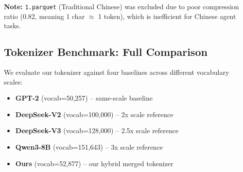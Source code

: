 \textbf{Note:} \texttt{1.parquet} (Traditional Chinese) was excluded due to poor compression ratio (0.82, meaning 1 char $\approx$ 1 token), which is inefficient for Chinese agent tasks.

\subsection{Tokenizer Benchmark: Full Comparison}

We evaluate our tokenizer against four baselines across different vocabulary scales:
\begin{itemize}
    \item \textbf{GPT-2} (vocab=50,257) -- same-scale baseline
    \item \textbf{DeepSeek-V2} (vocab=100,000) -- 2x scale reference
    \item \textbf{DeepSeek-V3} (vocab=128,000) -- 2.5x scale reference
    \item \textbf{Qwen3-8B} (vocab=151,643) -- 3x scale reference
    \item \textbf{Ours} (vocab=52,877) -- our hybrid merged tokenizer
\end{itemize}

\begin{table}[h]
    \centering
    \caption{Tokenizer Compression Benchmark: tok/char (lower is better)}
\end{table}

